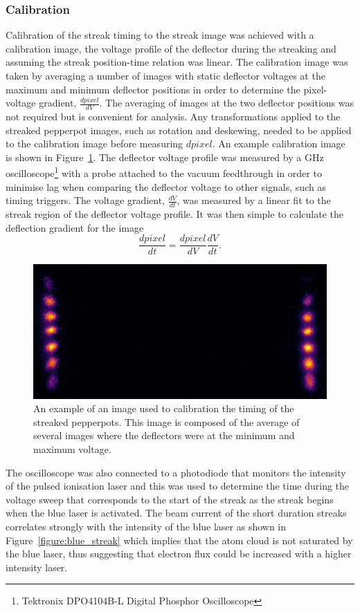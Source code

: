 \subsubsection{Calibration}
Calibration of the streak timing to the streak image was achieved with a calibration image, the voltage profile of the deflector during the streaking and assuming the streak position-time relation was linear.
The calibration image was taken by averaging a number of images with static deflector voltages at the maximum and minimum deflector positions in order to determine the pixel-voltage gradient, $\frac{dpixel}{dV}$.
The averaging of images at the two deflector positions was not required but is convenient for analysis.
Any transformations applied to the streaked pepperpot images, such as rotation and deskewing, needed to be applied to the calibration image before measuring $dpixel$.
An example calibration image is shown in Figure~\ref{figure:example_calibration}.
The deflector voltage profile was measured by a \unit[1]{GHz} oscilloscope\footnote{Tektronix DPO4104B-L Digital Phosphor Oscilloscope} with a probe attached to the vacuum feedthrough in order to minimise lag when comparing the deflector voltage to other signals, such as timing triggers.
The voltage gradient, $\frac{dV}{dt}$, was measured by a linear fit to the streak region of the deflector voltage profile.
It was then simple to calculate the  deflection gradient for the image
\begin{equation}
\frac{dpixel}{dt} = \frac{dpixel}{dV} \frac{dV}{dt}.
\end{equation}

\begin{figure}
    \center
    \includegraphics[width=0.5\linewidth]{part2/Figs/example_calibration.jpeg}
    \caption{An example of an image used to calibration the timing of the streaked pepperpots.
    This image is composed of the average of several images where the deflectors were at the minimum and maximum voltage.}
    \label{figure:example_calibration}
\end{figure}

The oscilloscope was also connected to a photodiode that monitors the intensity of the pulsed ionisation laser and this was used to determine the time during the voltage sweep that corresponds to the start of the streak as the streak begins when the blue laser is activated.
The beam current of the short duration streaks correlates strongly with the intensity of the blue laser as shown in Figure~\ref{figure:blue_streak} which implies that the atom cloud is not saturated by the blue laser, thus suggesting that electron flux could be increased with a higher intensity laser.

